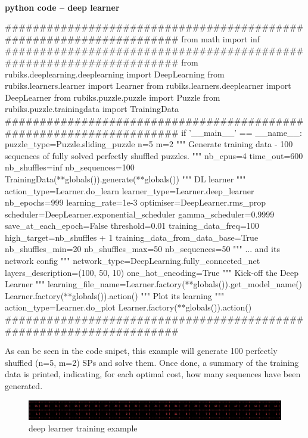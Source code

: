 \paragraph{}{\textbf{python code -- deep learner}}
\begin{python}
####################################################################
from math import inf
####################################################################
from rubiks.deeplearning.deeplearning import DeepLearning
from rubiks.learners.learner import Learner
from rubiks.learners.deeplearner import DeepLearner
from rubiks.puzzle.puzzle import Puzzle
from rubiks.puzzle.trainingdata import TrainingData
####################################################################
if '__main__' == __name__:
    puzzle_type=Puzzle.sliding_puzzle
    n=5
    m=2
    """ Generate training data - 100 sequences of fully 
    solved perfectly shuffled puzzles. 
    """
    nb_cpus=4
    time_out=600
    nb_shuffles=inf
    nb_sequences=100
    TrainingData(**globals()).generate(**globals())
    """ DL learner """
    action_type=Learner.do_learn
    learner_type=Learner.deep_learner
    nb_epochs=999
    learning_rate=1e-3
    optimiser=DeepLearner.rms_prop
    scheduler=DeepLearner.exponential_scheduler
    gamma_scheduler=0.9999
    save_at_each_epoch=False
    threshold=0.01
    training_data_freq=100
    high_target=nb_shuffles + 1
    training_data_from_data_base=True
    nb_shuffles_min=20
    nb_shuffles_max=50
    nb_sequences=50
    """ ... and its network config """
    network_type=DeepLearning.fully_connected_net
    layers_description=(100, 50, 10)
    one_hot_encoding=True
    """ Kick-off the Deep Learner """
    learning_file_name=Learner.factory(**globals()).get_model_name()
    Learner.factory(**globals()).action()
    """ Plot its learning """
    action_type=Learner.do_plot
    Learner.factory(**globals()).action()
####################################################################
\end{python}
\black

As can be seen in the code snipet, this example will generate 100 perfectly shuffled (n=5, m=2) SPs and solve them. Once done, a summary of the training data is printed, indicating, for each optimal cost, how many sequences have been generated.

\begin{figure}[H]
\centering
\includegraphics[scale=0.45]{./Figures/exampledeeplearnertraining}
\caption[Examples]{deep learner training example}
\label{fig:exampledeeplearnertraining}
\end{figure}

